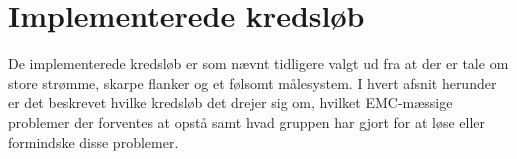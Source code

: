 \chapter{Implementerede kredsløb}

De implementerede kredsløb er som nævnt tidligere valgt ud fra at der er tale om store strømme, skarpe flanker og et følsomt målesystem. 
I hvert afsnit herunder er det beskrevet hvilke kredsløb det drejer sig om, hvilket EMC-mæssige problemer der forventes at opstå samt hvad gruppen har gjort for at løse eller formindske disse problemer.



